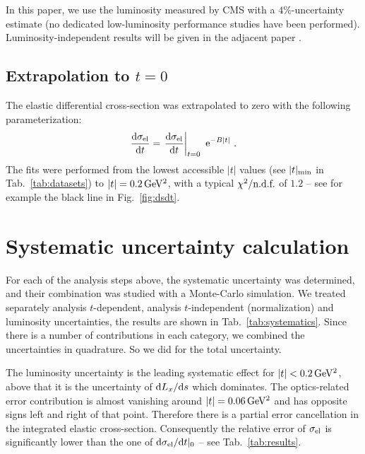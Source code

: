 \documentclass[doublecol]{../macros/epl2}
\def\d{{\rm d}}
\def\un#1{\,{\rm #1}}
\def\e{{\rm e}}
\begin{document}
In this paper, we use the luminosity measured by CMS with a $4\%$-uncertainty estimate (no dedicated low-luminosity performance studies have been performed). Luminosity-independent results will be given in the adjacent paper \cite{P3}.


\subsection{Extrapolation to $t=0$}

The elastic differential cross-section was extrapolated to zero with the following parameterization:
\begin{equation}
\label{eq:extrapolation}
{\d\sigma_{\rm el}\over \d t} = \left. {\d\sigma_{\rm el}\over \d t}\right|_{t=0} \ \e^{-B|t|}\ .
\end{equation}
The fits were performed from the lowest accessible $|t|$ values (see $|t|_{\rm min}$ in Tab.~\ref{tab:datasets}) to $|t| = 0.2\un{GeV^2}$, with a typical $\chi^2/\hbox{n.d.f.}$ of $1.2$ -- see for example the black line in Fig.~\ref{fig:dsdt}.

\section{Systematic uncertainty calculation}


For each of the analysis steps above, the systematic uncertainty was determined, and their combination was studied with a Monte-Carlo simulation. We treated separately analysis $t$-dependent, analysis $t$-independent (normalization) and luminosity uncertainties, the results are shown in Tab.~\ref{tab:systematics}. Since there is a number of contributions in each category, we combined the uncertainties in quadrature. So we did for the total uncertainty.

The luminosity uncertainty is the leading systematic effect for $|t| < 0.2\un{GeV^2}$, above that it is the uncertainty of $\d L_x/\d s$ which dominates. The optics-related error contribution is almost vanishing around $|t| = 0.06\un{GeV^2}$ and has opposite signs left and right of that point. Therefore there is a partial error cancellation in the integrated elastic cross-section. Consequently the relative error of $\sigma_{\rm el}$ is significantly lower than the one of $\d\sigma_{\rm el}/\d t|_0$ -- see Tab.~\ref{tab:results}.
\end{document}
